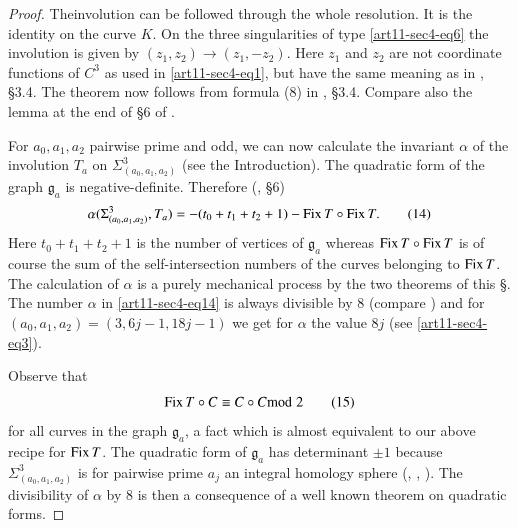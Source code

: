 \begin{proof}
The\pageoriginale involution can be followed through the whole resolution. It is the identity on the curve $K$. On the three singularities of type \eqref{art11-sec4-eq6} the involution is given by $(z_{1},z_{2})\to (z_{1},-z_{2})$. Here $z_{1}$ and $z_{2}$ are not coordinate functions of $C^{3}$ as used in \eqref{art11-sec4-eq1}, but have the same meaning as in \cite{art11-key6}, \S3.4. The theorem now follows from formula (8) in \cite{art11-key6}, \S3.4. Compare also the lemma at the end of \S6 of \cite{art11-key7}.

For $a_{0},a_{1},a_{2}$ pairwise prime and odd, we can now calculate the invariant $\alpha$ of the involution $T_{a}$ on $\Sigma^{3}_{(a_{0},a_{1},a_{2})}$ (see the Introduction). The quadratic form of the graph $\mathfrak{g}_{a}$ is negative-definite. Therefore (\cite{art11-key7}, \S6)
\begin{equation*}
\alpha(\Sigma^{3}_{(a_{0},a_{1},a_{2})},T_{a})=-(t_{0}+t_{1}+t_{2}+1)-\operatorname{\mathrm{Fix}} T\circ \operatorname{\mathrm{Fix}} T.\tag{14}\label{art11-sec4-eq14}
\end{equation*}
Here $t_{0}+t_{1}+t_{2}+1$ is the number of vertices of $\mathfrak{g}_{a}$ whereas $\operatorname{\mathrm{Fix}} T\circ \operatorname{\mathrm{Fix}} T$ is of course the sum of the self-intersection numbers of the curves belonging to $\operatorname{\mathrm{Fix}} T$. The calculation of $\alpha$ is a purely mechanical process by the two theorems of this \S. The number $\alpha$ in \eqref{art11-sec4-eq14} is always divisible by 8 (compare \cite{art11-key7}) and for $(a_{0},a_{1},a_{2})=(3,6j-1,18j-1)$ we get for $\alpha$ the value $8j$ (see \eqref{art11-sec4-eq3}).

Observe that
\begin{equation*}
\operatorname{\mathrm{Fix}} T\circ C\equiv C\circ C{\rm{mod}}\kern.3em 2\tag{15}\label{art11-sec4-eq15}
\end{equation*}
for all curves in the graph $\mathfrak{g}_{a}$, a fact which is almost equivalent to our above recipe for $\operatorname{\mathrm{Fix}} T$. The quadratic form of $\mathfrak{g}_{a}$ has determinant $\pm 1$ because $\Sigma^{3}_{(a_{0},a_{1},a_{2})}$ is for pairwise prime $a_{j}$ an integral homology sphere (\cite{art11-key1}, \cite{art11-key2}, \cite{art11-key7}). The divisibility of $\alpha$ by 8 is then a consequence of a well known theorem on quadratic forms.


\end{proof}
